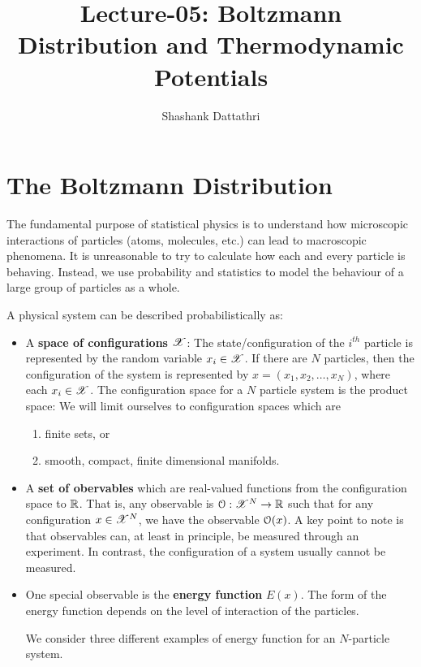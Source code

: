 \documentclass[letterpaper,english,10pt]{article}
\title{Lecture-05: Boltzmann Distribution and Thermodynamic Potentials}
\author{Shashank Dattathri}
\begin{document}
\maketitle
\section{The Boltzmann Distribution}
The fundamental purpose of statistical physics is to understand how microscopic interactions of particles (atoms, molecules, etc.) can lead to macroscopic phenomena. 
It is unreasonable to try to calculate how each and every particle is behaving. 
Instead, we use probability and statistics to model the behaviour of a large group of particles as a whole. 

A physical system can be described probabilistically as: 
\begin{itemize}
\item A \textbf{space of configurations $\mathscr{X}$}: The state/configuration of the $i^{th}$ particle is represented by the random variable $x_i \in \mathscr{X}$. If there are $N$ particles, then the configuration of the system is represented by $x=\left(x_1, x_2,\ldots ,x_N \right)$, where each $x_i \in \mathscr{X}$. The configuration space for a $N$ particle system is the product space: 
We will limit ourselves to configuration spaces which are 
\begin{enumerate}[$(i)$]
\item finite sets, or 
\item smooth, compact, finite dimensional manifolds. 
\end{enumerate}
\item A \textbf{set of obervables} which are real-valued functions from the configuration space to $\mathbb{R}$. 
That is, any observable is $\mathcal{O}:{\mathscr{X}}^N \to \mathbb{R}$ such that for any configuration $x \in \mathscr{X}^N$, 
we have the observable $\mathcal{O}(x)$. 
A key point to note is that observables can, at least in principle, be measured through an experiment. In contrast, the configuration of a system usually cannot be measured. 
\item One special observable is the \textbf{energy function} $E(x)$. 
The form of the energy function depends on the level of interaction of the particles. 
\begin{exmp}
\begin{enumerate} 
We consider three different examples of energy function for an $N$-particle system. 

\end{enumerate}
\end{exmp}
\end{itemize}
\end{document}
